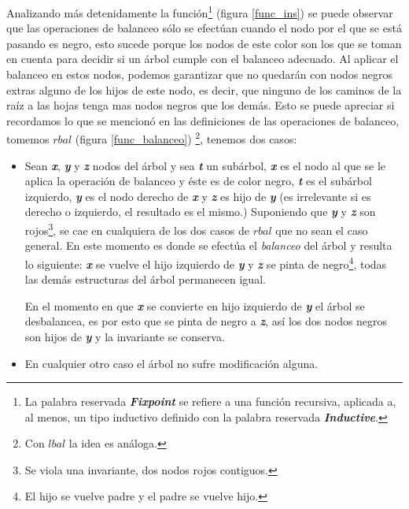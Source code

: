 Analizando m\'as detenidamente la funci\'on\footnote{La palabra reservada \textit{\textbf{Fixpoint}}
se refiere a una funci\'on recursiva, aplicada a, al menos, un tipo inductivo definido con la palabra reservada \textit{\textbf{Inductive}}\cite{IndAndRec}.} (figura \ref{func_ins}) se puede observar que las
operaciones de balanceo s\'olo se efectúan cuando el nodo por el que se est\'a pasando es negro, esto
sucede porque los nodos de este color son los que se toman en cuenta para decidir si
un \'arbol cumple con el balanceo adecuado. Al aplicar el balanceo en estos nodos, podemos 
garantizar que no quedar\'an con nodos negros extras alguno de los hijos de este nodo, es decir, que
ninguno de los caminos de la ra\'iz a las hojas tenga mas nodos negros que los demás. Esto se puede
apreciar si recordamos lo que se mencion\'o en las definiciones de las operaciones de balanceo, 
tomemos \hyperref[func_balanceo]{$rbal$} (figura \ref{func_balanceo})
\footnote{Con \hyperref[func_balanceo]{$lbal$} la idea es an\'aloga.}, tenemos dos casos:

\begin{itemize}
    \item Sean \textbf{\textit{x}}, \textbf{\textit{y}} y \textbf{\textit{z}} nodos del \'arbol y 
    sea \textbf{\textit{t}} un subárbol, \textbf{\textit{x}} es el nodo al que se le aplica la 
    operaci\'on de balanceo y \'este es de color negro, \textbf{\textit{t}} es el subárbol izquierdo,
    \textbf{\textit{y}} es el nodo derecho de \textbf{\textit{x}} y \textbf{\textit{z}} es hijo de
    \textbf{\textit{y}} (es irrelevante si es derecho o izquierdo, el resultado es el mismo.) 
    Suponiendo que \textbf{\textit{y}} y \textbf{\textit{z}} son rojos\footnote{Se viola una 
    invariante, dos nodos rojos contiguos.}, se cae en cualquiera de los dos casos de
    \hyperref[func_balanceo]{$rbal$} que no sean el caso general. En este momento es donde se 
    efectúa el \textit{balanceo} del árbol y resulta lo siguiente: \textbf{\textit{x}} se vuelve el 
    hijo izquierdo de \textbf{\textit{y}} y \textbf{\textit{z}} se pinta de negro\footnote{El hijo 
    se vuelve padre y el padre se vuelve hijo.}, todas las dem\'as estructuras del \'arbol 
    permanecen igual.

    En el momento en que \textbf{\textit{x}} se convierte en hijo izquierdo de \textbf{\textit{y}}
    el \'arbol se desbalancea, es por esto que se pinta de negro a \textbf{\textit{z}}, así los dos
    nodos negros son hijos de \textbf{\textit{y}} y la invariante se conserva.
    \item En cualquier otro caso el \'arbol no sufre modificaci\'on alguna.
\end{itemize}

